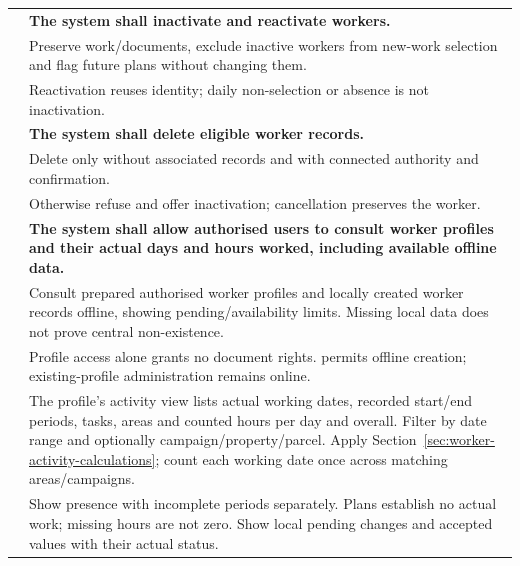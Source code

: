 {\begin{longtable}{L{0.18}L{0.82}}
\midrule
{}
\label{fr:021}\textbf{} & \textbf{The system shall inactivate and reactivate workers.}\\*
\label{ac:021:a} & Preserve work/documents, exclude inactive workers from new-work selection and flag future plans without changing them.\\
\label{ac:021:b} & Reactivation reuses identity; daily non-selection or absence is not inactivation.\\
\midrule
{}
\label{fr:022}\textbf{} & \textbf{The system shall delete eligible worker records.}\\*
\label{ac:022:a} & Delete only without associated records and with connected authority and confirmation.\\
\label{ac:022:b} & Otherwise refuse and offer inactivation; cancellation preserves the worker.\\
\midrule
{}
\label{fr:023}\textbf{} & \textbf{The system shall allow authorised users to consult worker profiles and their actual days and hours worked, including available offline data.}\\*
\label{ac:023:a} & Consult prepared authorised worker profiles and locally created worker records offline, showing pending/availability limits. Missing local data does not prove central non-existence.\\
\label{ac:023:b} & Profile access alone grants no document rights.  permits offline creation; existing-profile administration remains online.\\
\label{ac:023:c} & The profile's activity view lists actual working dates, recorded start/end periods, tasks, areas and counted hours per day and overall. Filter by date range and optionally campaign/property/parcel. Apply Section~\ref{sec:worker-activity-calculations}; count each working date once across matching areas/campaigns.\\
\label{ac:023:d} & Show presence with incomplete periods separately. Plans establish no actual work; missing hours are not zero. Show local pending changes and accepted values with their actual status.\\

\end{longtable}}
